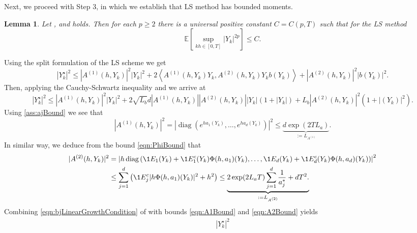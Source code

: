 \documentclass[3p]{elsarticle}
\theoremstyle{definition}
\theoremstyle{plain}%
\newtheorem{lem}{Lemma}[section]
\theoremstyle{remark}
\newcommand{\m}[1]{\mathbb{E}#1}
\newcommand{\innerprod}[2]{\left\langle#1, #2\right\rangle}
\DeclareMathOperator{\diag}{diag}
\newcommand{\SM}{LS\xspace}
\begin{document}
	Next, we proceed with Step 3, in which we establish that \SM method has bounded moments.
\begin{lem}\label{lem:SSSMMomentBounds}
	Let ,   and  holds. Then for each $p\geq 2$ there is 
	a universal positive constant 
	$C=C(p,T)$ 
	such that for the \SM method
	\begin{equation*}
		\m\left[
		\sup_{kh \in [0,T]}
		|Y_k|^{2p}
		\right]\leq C.
	\end{equation*}
\end{lem}
\begin{pf}
	Using the split formulation of the \SM scheme  we get
	\begin{dmath}[label=leqn:Yn2Bound]
		|Y_k^{\star}|^{2}
		\leq
			|A^{(1)}(h,Y_k)|^2 |Y_k|^2  
			+ 2 \innerprod{A^{(1)}(h,Y_k)Y_k}{A^{(2)}(h,Y_k) Y_k b(Y_k)}
			+|A^{(2)}(h,Y_k)|^2 |b(Y_k)|^2.
	\end{dmath}
	Then, applying the Cauchy-Schwartz inequality and  we arrive at
	\begin{dmath*}[label=leqn:Yn2Bound]
		|Y_k^{\star}|^{2}
		\leq
		|A^{(1)}(h,Y_k)|^2 |Y_k|^2  
		+ 2 \sqrt{L_b} d|A^{(1)}(h,Y_k)||A^{(2)}(h,Y_k)||Y_k|(1+|Y_k|)
		+L_b|A^{(2)}(h,Y_k)|^2 (1+|(Y_k)|^2).
	\end{dmath*}
	Using \eqref{ass:ajBound} we see that
	\begin{dmath}[label=eqn:A1Bound]
		|A^{(1)}(h,Y_k)|^2 
		=
			\left|
				\diag
				\left(
					e^{ha_1(Y_k)}, \dots, e^{ha_d(Y_k)} 
				\right)
			\right|^2
		\leq
		 \underbrace{d \exp( 2 T L_a)}_{:= L_{A^{(1)}}}.		
	\end{dmath}
	In similar way, we deduce from the bound \eqref{eqn:PhiBound} that
	\begin{align}
		|A^{(2)}(h,Y_k)|^2 
		&=
		\left|
			h 
			\diag
			\left(
				\1{E_1}(Y_k)
				+\1{E_1^c}(Y_k)\Phi(h,a_1)(Y_k), 
				\dots,
				\1{E_d}(Y_k)
				+\1{E_d^c}(Y_k) \Phi(h,a_d)(Y_k)
			\right)
		\right|^2 \notag \\
		&\leq
		\sum_{j=1}^{d}
		\left(
			\1{E_j^c}
			|h\Phi(h,a_1)(Y_k)|^2
			+ h^2
		\right)
		\leq
		\underbrace{
			2\exp(2 L_a  T)
				\sum_{j=1}^d
				\frac{1}{a_j^*} + d T^2.			
		}_{:=L_{A^{(2)}}}
		\label{eqn:A2Bound}
	\end{align}
	Combining \eqref{eqn:bjLinearGrowthCondition} of  with bounds \eqref{eqn:A1Bound}
	and \eqref{eqn:A2Bound} yields
	\begin{align*}
		|Y_k^{\star}|^2

\end{align*}
\end{pf}
\end{document}
